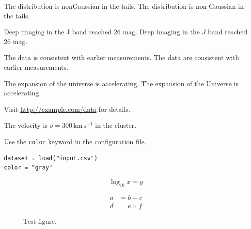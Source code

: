 \documentclass{article}
\begin{document}
\begin{acknowledgements}
The distribution is nonGaussian in the tails. %
The distribution is non-Gaussian in the tails. %

Deep imaging in the J band reached 26 mag. %
Deep imaging in the $\textit{J}$ band reached 26 mag. %

The data is consistent with earlier measurements. %
The data are consistent with earlier measurements. %

The expansion of the universe is accelerating. %
The expansion of the Universe is accelerating. %



\newcommand{\MyEuclid}{\textit{Euclid}} %

Visit \url{http://example.com/data} for details. %

The velocity is $v = 300\,\mathrm{km\,s^{-1}}$ in the cluster. %

Use the \texttt{color} keyword in the configuration file. %

\begin{verbatim}
dataset = load("input.csv")
color = "gray"
\end{verbatim}

\begin{equation}
\log_{10} x = y
\end{equation}

\begin{figure}
\begin{equation}
\begin{aligned}
  a &= b + c \\
  d &= e \times f
\end{aligned}
\end{equation}
\caption{Test figure.}
\end{figure}


\end{acknowledgements}
\end{document}
